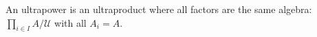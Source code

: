 An ultrapower is an ultraproduct where all factors are the same algebra: $\prod_{i \in I} A / \mathcal{U}$ with all $A_i = A$.
